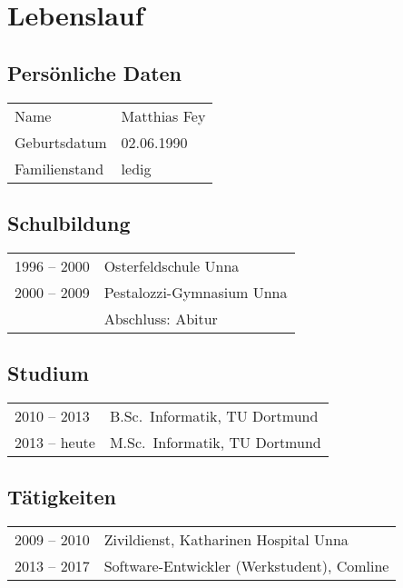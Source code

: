 \documentclass[10pt]{scrartcl}
\begin{document}

\section*{Lebenslauf}

\subsection*{Persönliche Daten}

\begin{tabular}{p{3cm}p{13cm}}
Name          & Matthias Fey\\
Geburtsdatum  & 02.06.1990\\
Familienstand & ledig\\
\end{tabular}

\subsection*{Schulbildung}

\begin{tabular}{p{3cm}p{13cm}}
1996 – 2000 & Osterfeldschule Unna\\
2000 – 2009 & Pestalozzi-Gymnasium Unna\\
            & Abschluss: Abitur\\
\end{tabular}

\subsection*{Studium}

\begin{tabular}{p{3cm}p{13cm}}
2010 – 2013  & B.Sc.\ Informatik, TU Dortmund\\
2013 – heute & M.Sc.\ Informatik, TU Dortmund\\
\end{tabular}

\subsection*{Tätigkeiten}

\begin{tabular}{p{3cm}p{13cm}}
2009 – 2010 & Zivildienst, Katharinen Hospital Unna\\
2013 – 2017 & Software-Entwickler (Werkstudent), Comline\\
\end{tabular}
\end{document}
